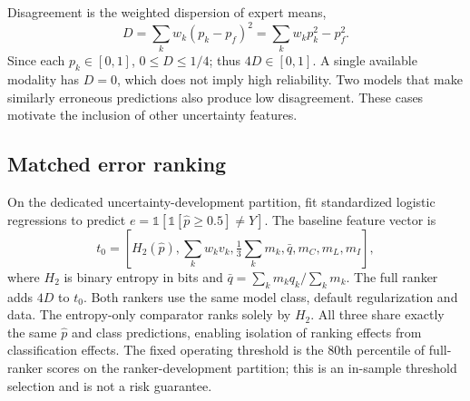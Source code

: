 \documentclass[conference]{IEEEtran}
\begin{document}
Disagreement is the weighted dispersion of expert means,
\begin{equation}
D=\sum_kw_k(p_k-p_f)^2=\sum_kw_kp_k^2-p_f^2.
\end{equation}
Since each $p_k\in[0,1]$, $0\leq D\leq1/4$; thus $4D\in[0,1]$. A single available modality has $D=0$, which does not imply high reliability. Two models that make similarly erroneous predictions also produce low disagreement. These cases motivate the inclusion of other uncertainty features.
\subsection{Matched error ranking}
On the dedicated uncertainty-development partition, fit standardized logistic regressions to predict $e=\mathbb{1}[\mathbb{1}[\hat p\geq0.5]\neq Y]$. The baseline feature vector is
\begin{equation}
 t_0=[H_2(\hat p),\sum_kw_kv_k,\tfrac{1}{3}\sum_km_k,\bar q,m_C,m_L,m_I],
\end{equation}
where $H_2$ is binary entropy in bits and $\bar q=\sum_k m_k q_k/\sum_km_k$. The full ranker adds $4D$ to $t_0$. Both rankers use the same model class, default regularization and data. The entropy-only comparator ranks solely by $H_2$. All three share exactly the same $\hat p$ and class predictions, enabling isolation of ranking effects from classification effects. The fixed operating threshold is the 80th percentile of full-ranker scores on the ranker-development partition; this is an in-sample threshold selection and is not a risk guarantee.
\end{document}
